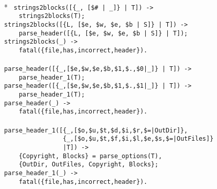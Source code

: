 \begin{flushleft}
\label{parsing_2_13}
\\*
\tt
\noindent{}%
\verb&strings2blocks([{_, [$# | _]} | T]) ->&\\
\noindent{}%
\verb&    strings2blocks(T);&\\
\noindent{}%
\verb&strings2blocks([{L, [$e, $w, $e, $b | S]} | T]) ->&\\
\noindent{}%
\verb&    parse_header([{L, [$e, $w, $e, $b | S]} | T]);&\\
\noindent{}%
\verb&strings2blocks(_) ->&\\
\noindent{}%
\verb&    fatal({file,has,incorrect,header}).&\\
\noindent{}%
\verb&&\\
\noindent{}%
\verb&parse_header([{_,[$e,$w,$e,$b,$1,$.,$0|_]} | T]) ->&\\
\noindent{}%
\verb&    parse_header_1(T);&\\
\noindent{}%
\verb&parse_header([{_,[$e,$w,$e,$b,$1,$.,$1|_]} | T]) ->&\\
\noindent{}%
\verb&    parse_header_1(T);&\\
\noindent{}%
\verb&parse_header(_) ->&\\
\noindent{}%
\verb&    fatal({file,has,incorrect,header}).&\\
\noindent{}%
\verb&&\\
\noindent{}%
\verb&parse_header_1([{_,[$o,$u,$t,$d,$i,$r,$=|OutDir]},&\\
\noindent{}%
\verb&                {_,[$o,$u,$t,$f,$i,$l,$e,$s,$=|OutFiles]}&\\
\noindent{}%
\verb&                |T]) ->&\\
\noindent{}%
\verb&    {Copyright, Blocks} = parse_options(T),&\\
\noindent{}%
\verb&    {OutDir, OutFiles, Copyright, Blocks};&\\
\noindent{}%
\verb&parse_header_1(_) ->&\\
\noindent{}%
\verb&    fatal({file,has,incorrect,header}).&\\
\end{flushleft}

